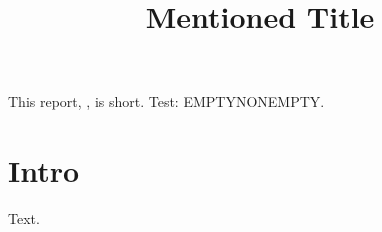 \documentclass{article}
\title{Mentioned Title}
\makeatletter
\def\mytest{\ifx\@title\@empty EMPTY\else NONEMPTY\fi}
\makeatother
\begin{document}
This report, \@title, is short. Test: \mytest.
\section{Intro}
Text.
\end{document}
